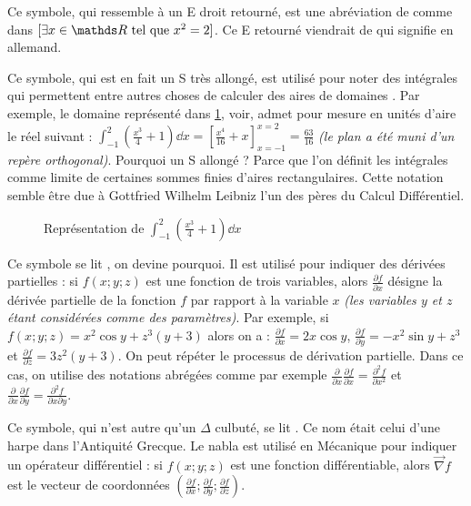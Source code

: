 \cadre{$\exists$} Ce symbole, qui ressemble à un E droit retourné, est une abréviation
de  comme dans $[ \exists x \in \RR \text{ tel que } x^2 = 2 ]$.
Ce E retourné viendrait de  qui signifie  en allemand.

\cadre{$\displaystyle \int$} Ce symbole, qui est en fait un S très allongé, est utilisé
pour noter des intégrales qui permettent entre autres choses de calculer des aires
de domaines . Par exemple, le domaine représenté dans
 \ref{domainIntegral}, voir, admet pour mesure en unités d'aire le réel suivant :
$ {\displaystyle \int_{-1}^{2}} (\frac{x^3}{4} + 1) \dd x = [ \frac{x^4}{16} + x ]_{x=-1}^{x=2} = \frac{63}{16}$
 \emph{(le plan a été muni d'un repère orthogonal)}.
Pourquoi un S allongé ? Parce que l'on définit les intégrales comme limite
de certaines sommes finies d'aires rectangulaires. Cette notation semble être
due à Gottfried Wilhelm Leibniz l'un des pères du Calcul Différentiel.

\begin{figure}[h]
	
	\vspace{-2em}
	\caption{%
		Représentation de%
		$ \displaystyle \int_{-1}^{2} \left( \frac{x^3}{4} + 1 \right)  \dd x $%
	}
	\label{domainIntegral}
\end{figure}

\cadre{$\partial$} Ce symbole\label{partialDer} se lit , on devine pourquoi.
Il est utilisé pour indiquer des dérivées partielles : si $f(x;y;z)$ est une fonction
de trois variables, alors $\frac{\partial f}{\partial x} $ désigne la dérivée partielle
de la fonction $f$ par rapport à la variable $x$ \emph{(les variables $y$ et $z$ étant
considérées comme des paramètres)}.
Par exemple, si $f(x;y;z) = x^{2} \cos y +  z^{3} (y + 3)$ alors on a :
$\frac{\partial f}{\partial x}  = 2 x \cos y$, $\frac{\partial f}{\partial y}  = - x^2 \sin y +  z^3$
et $\frac{\partial f}{\partial z}  = 3 z^2 (y + 3)$.
On peut répéter le processus de dérivation partielle. Dans ce cas, on utilise
des notations abrégées comme par exemple
$\frac{\partial}{\partial x} \frac{\partial f}{\partial x}  = \frac{\partial^2 f}{\partial x^2} $
et
$\frac{\partial}{\partial x} \frac{\partial f}{\partial y}  = \frac{\partial^2 f}{\partial x \partial y} $.

\cadre{$\nabla$} Ce symbole, qui n'est autre qu'un $\Delta$ culbuté, se lit .
Ce nom était celui d'une harpe dans l'Antiquité Grecque. Le nabla est utilisé en Mécanique
pour indiquer un opérateur différentiel : si $f(x;y;z)$ est une fonction différentiable,
alors $\vec{\nabla} f $ est le vecteur de coordonnées
$( \frac{\partial f}{\partial x} ; \frac{\partial f}{\partial y} ; \frac{\partial f}{\partial z})$.
